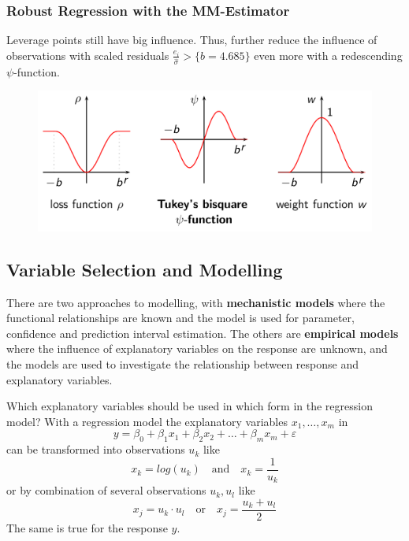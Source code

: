 \documentclass[11pt]{article}
\theoremstyle{definition}
\begin{document}
\subsubsection{Robust Regression with the MM-Estimator}
Leverage points still have big influence. Thus, further reduce the influence of observations with scaled residuals $\frac{e_i}{\hat{\sigma}} > \{b = 4.685\}$ even more with a redescending $\psi$-function.
\begin{figure}[H]
	\centering
	\includegraphics[width=0.8\linewidth]{img/robust_mm_estimator.png}
\end{figure}

\subsection{Variable Selection and Modelling}
There are two approaches to modelling, with \textbf{mechanistic models} where the functional relationships are known and the model is used for parameter, confidence and prediction interval estimation. The others are \textbf{empirical models} where the influence of explanatory variables on the response are unknown, and the models are used to investigate the relationship between response and explanatory variables.

Which  explanatory variables should be used in which form in the regression model? With a regression model the explanatory variables $x_1,\dots,x_m$ in
\begin{equation*}
	y = \beta_0 + \beta_1 x_1 + \beta_2 x_2 + \dots + \beta_m x_m + \varepsilon
\end{equation*}
can be transformed into observations $u_k$ like
\begin{equation*}
	x_k = log(u_k) \quad\text{and}\quad x_k = \frac{1}{u_k}
\end{equation*}
or by combination of several observations $u_k, u_l$ like
\begin{equation*}
	x_j = u_k\cdot u_l\quad\text{or}\quad x_j = \frac{u_k + u_l}{2}
\end{equation*}
The same is true for the response $y$.
\end{document}
